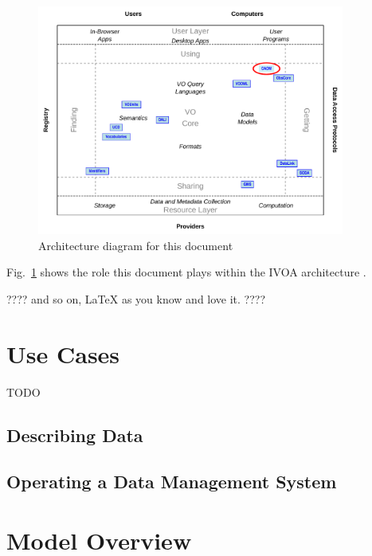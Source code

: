 \documentclass[11pt,a4paper]{ivoa}
\begin{document}
\begin{figure}
\centering


\includegraphics[width=0.9\textwidth]{role_diagram.pdf}
\caption{Architecture diagram for this document}
\label{fig:archdiag}
\end{figure}

Fig.~\ref{fig:archdiag} shows the role this document plays within the
IVOA architecture \citep{2021ivoa.spec.1101D}.

???? and so on, LaTeX as you know and love it. ????

\section{Use Cases}

TODO

\subsection{Describing Data}

\subsection{Operating a Data Management System}

\section{Model Overview}
\end{document}
